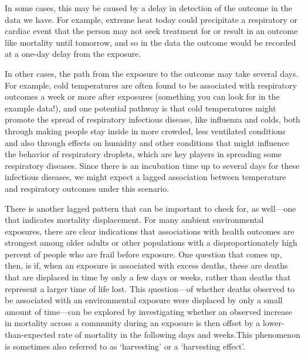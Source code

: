 \documentclass[
]{book}
\begin{document}
In some cases, this may be caused by a delay in detection of the outcome in the
data we have. For example, extreme heat today could precipitate a respiratory or
cardiac event that the person may not seek treatment for or result in an outcome
like mortality until tomorrow, and so in the data the outcome would be recorded
at a one-day delay from the exposure.

In other cases, the path from the exposure to the outcome may take several days.
For example, cold temperatures are often found to be associated with respiratory
outcomes a week or more after exposures (something you can look for in the
example data!), and one potential pathway is that cold temperatures might
promote the spread of respiratory infectious disease, like influenza and colds,
both through making people stay inside in more crowded, less ventilated
conditions and also through effects on humidity and other conditions that might
influence the behavior of respiratory droplets, which are key players in
spreading some respiratory diseases. Since there is an incubation time up to
several days for these infectious diseases, we might expect a lagged association
between temperature and respiratory outcomes under this scenario.

There is another lagged pattern that can be important to check for, as well---one
that indicates mortality displacement. For many ambient environmental exposures,
there are clear indications that associations with health outcomes are strongest
among older adults or other populations with a disproportionately high percent
of people who are frail before exposure. One question that comes up, then, is
if, when an exposure is associated with excess deaths, these are deaths that are
displaced in time by only a few days or weeks, rather than deaths that represent
a larger time of life lost. This question---of whether deaths observed to be
associated with an environmental exposure were displaced by only a small amount of
time---can be explored by investigating whether an observed increase in mortality
across a community during an exposure is then offset by a lower-than-expected
rate of mortality in the following days and weeks.This phenomenon is sometimes
also referred to as `harvesting' or a `harvesting effect'.
\end{document}
